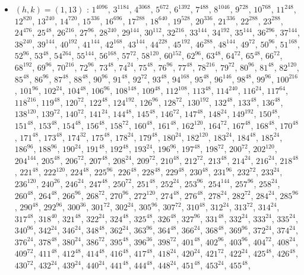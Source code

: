 \begin{itemize}
\item $(h,k)=(1,13)$ : $1^{4096}$, $3^{1184}$, $4^{3068}$, $5^{672}$, $6^{1392}$, $7^{488}$, $8^{1046}$, $9^{728}$, $10^{768}$, $11^{248}$, $12^{820}$, $13^{240}$, $14^{720}$, $15^{336}$, $16^{696}$, $17^{288}$, $18^{640}$, $19^{528}$, $20^{336}$, $21^{336}$, $22^{288}$, $23^{288}$, $24^{476}$, $25^{48}$, $26^{216}$, $27^{96}$, $28^{240}$, $29^{144}$, $30^{112}$, $32^{216}$, $33^{144}$, $34^{192}$, $35^{144}$, $36^{296}$, $37^{144}$, $38^{240}$, $39^{144}$, $40^{192}$, $41^{144}$, $42^{168}$, $43^{144}$, $44^{228}$, $45^{192}$, $46^{288}$, $48^{144}$, $49^{72}$, $50^{96}$, $51^{168}$, $52^{96}$, $53^{48}$, $54^{264}$, $55^{144}$, $56^{168}$, $57^{72}$, $58^{120}$, $60^{152}$, $62^{96}$, $63^{48}$, $64^{72}$, $65^{48}$, $66^{72}$, $68^{192}$, $69^{96}$, $70^{216}$, $72^{96}$, $73^{48}$, $74^{24}$, $75^{48}$, $76^{96}$, $77^{48}$, $78^{216}$, $79^{72}$, $80^{96}$, $81^{48}$, $82^{120}$, $85^{48}$, $86^{96}$, $87^{48}$, $88^{48}$, $90^{96}$, $91^{48}$, $92^{72}$, $93^{48}$, $94^{168}$, $95^{48}$, $96^{146}$, $98^{48}$, $99^{96}$, $100^{216}$, $101^{96}$, $102^{24}$, $104^{48}$, $106^{96}$, $108^{148}$, $109^{48}$, $112^{108}$, $113^{48}$, $114^{240}$, $116^{24}$, $117^{64}$, $118^{216}$, $119^{48}$, $120^{72}$, $122^{48}$, $124^{192}$, $126^{96}$, $128^{72}$, $130^{192}$, $132^{48}$, $133^{48}$, $136^{48}$, $138^{120}$, $139^{72}$, $140^{72}$, $141^{24}$, $144^{48}$, $145^{48}$, $146^{72}$, $147^{48}$, $148^{24}$, $149^{192}$, $150^{48}$, $151^{48}$, $153^{48}$, $154^{48}$, $156^{48}$, $158^{72}$, $160^{48}$, $161^{48}$, $162^{120}$, $164^{72}$, $167^{48}$, $168^{48}$, $170^{48}$, $171^{48}$, $173^{48}$, $174^{32}$, $175^{48}$, $178^{24}$, $179^{48}$, $180^{24}$, $182^{120}$, $183^{24}$, $184^{48}$, $185^{24}$, $186^{96}$, $188^{96}$, $190^{24}$, $191^{48}$, $192^{48}$, $193^{24}$, $196^{96}$, $197^{48}$, $198^{72}$, $200^{72}$, $202^{120}$, $204^{144}$, $205^{48}$, $206^{72}$, $207^{48}$, $208^{24}$, $209^{72}$, $210^{48}$, $212^{72}$, $213^{48}$, $214^{24}$, $216^{24}$, $218^{48}$, $221^{48}$, $222^{120}$, $224^{48}$, $225^{96}$, $226^{48}$, $228^{48}$, $229^{48}$, $230^{48}$, $231^{96}$, $232^{72}$, $233^{24}$, $236^{120}$, $240^{26}$, $246^{24}$, $247^{48}$, $250^{72}$, $251^{48}$, $252^{24}$, $253^{96}$, $254^{144}$, $257^{96}$, $258^{24}$, $260^{48}$, $264^{48}$, $266^{96}$, $268^{72}$, $270^{96}$, $272^{120}$, $274^{48}$, $276^{48}$, $278^{24}$, $282^{72}$, $284^{24}$, $285^{96}$, $290^{48}$, $292^{96}$, $300^{36}$, $301^{72}$, $302^{24}$, $305^{96}$, $307^{72}$, $310^{48}$, $312^{24}$, $313^{72}$, $314^{24}$, $317^{48}$, $318^{40}$, $321^{48}$, $322^{24}$, $324^{48}$, $325^{48}$, $326^{48}$, $327^{96}$, $331^{48}$, $332^{24}$, $333^{24}$, $335^{24}$, $340^{96}$, $342^{24}$, $346^{24}$, $348^{48}$, $362^{24}$, $363^{96}$, $364^{48}$, $366^{24}$, $368^{48}$, $369^{96}$, $372^{24}$, $374^{24}$, $376^{24}$, $378^{48}$, $380^{24}$, $386^{72}$, $395^{48}$, $396^{36}$, $398^{72}$, $401^{48}$, $402^{96}$, $403^{96}$, $404^{72}$, $408^{24}$, $409^{72}$, $411^{48}$, $412^{48}$, $414^{48}$, $416^{48}$, $417^{48}$, $418^{24}$, $420^{24}$, $421^{72}$, $422^{24}$, $425^{48}$, $426^{48}$, $430^{72}$, $432^{24}$, $439^{24}$, $440^{24}$, $441^{48}$, $444^{48}$, $448^{24}$, $451^{48}$, $453^{24}$, $455^{48}$, 
\end{itemize}

